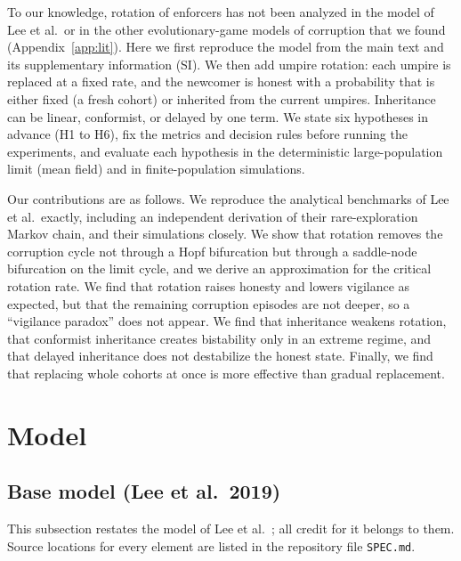 \documentclass[11pt]{article}
\begin{document}
To our knowledge, rotation of enforcers has not been analyzed in the model of Lee et al.\ or in
the other evolutionary-game models of corruption that we found (Appendix~\ref{app:lit}). Here we
first reproduce the model from the main text and its supplementary information (SI). We then add umpire rotation: each umpire is replaced at a fixed rate, and the
newcomer is honest with a probability that is either fixed (a fresh cohort) or inherited from the
current umpires. Inheritance can be linear, conformist, or delayed by one term. We state six
hypotheses in advance (H1 to H6), fix the metrics and decision rules before running the
experiments, and evaluate each hypothesis in the deterministic large-population limit (mean
field) and in finite-population simulations.

Our contributions are as follows. We reproduce the analytical benchmarks of Lee et al.\ exactly,
including an independent derivation of their rare-exploration Markov chain, and their simulations
closely. We show that rotation removes the corruption cycle not through a Hopf bifurcation
but through a saddle-node bifurcation on the limit cycle, and we derive an approximation for the
critical rotation rate. We find that rotation raises honesty and lowers vigilance as expected,
but that the remaining corruption episodes are not deeper, so a ``vigilance paradox'' does not
appear. We find that inheritance weakens rotation, that conformist inheritance creates
bistability only in an extreme regime, and that delayed inheritance does not destabilize the
honest state. Finally, we find that replacing whole cohorts at once is more effective than
gradual replacement.

\section{Model}

\subsection{Base model (Lee et al.\ 2019)}\label{sec:base}

This subsection restates the model of Lee et al.~\cite{lee2019social}; all credit for it belongs
to them. Source locations for every element are listed in the repository file \texttt{SPEC.md}.
\end{document}
